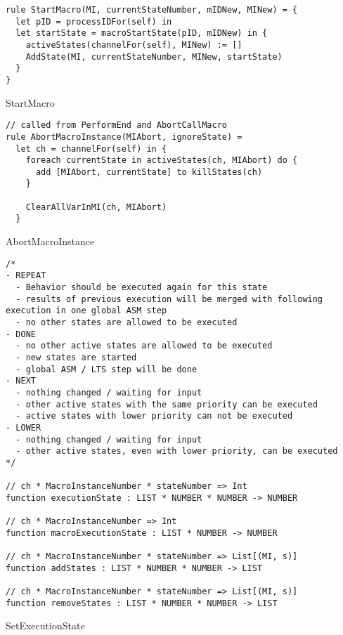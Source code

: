 \begin{listing}[H]
\begin{verbatim}
rule StartMacro(MI, currentStateNumber, mIDNew, MINew) = {
  let pID = processIDFor(self) in
  let startState = macroStartState(pID, mIDNew) in {
    activeStates(channelFor(self), MINew) := []
    AddState(MI, currentStateNumber, MINew, startState)
  }
}
\end{verbatim}
\caption{StartMacro}
\label{lst:asm:StartMacro}
\end{listing}


\begin{listing}[H]
\begin{verbatim}
// called from PerformEnd and AbortCallMacro
rule AbortMacroInstance(MIAbort, ignoreState) =
  let ch = channelFor(self) in {
    foreach currentState in activeStates(ch, MIAbort) do {
      add [MIAbort, currentState] to killStates(ch)
    }

    ClearAllVarInMI(ch, MIAbort)
  }
\end{verbatim}
\caption{AbortMacroInstance}
\label{lst:asm:AbortMacroInstance}
\end{listing}



\begin{listing}[H]
\begin{verbatim}
/*
- REPEAT
  - Behavior should be executed again for this state
  - results of previous execution will be merged with following execution in one global ASM step
  - no other states are allowed to be executed
- DONE
  - no other active states are allowed to be executed
  - new states are started
  - global ASM / LTS step will be done
- NEXT
  - nothing changed / waiting for input
  - other active states with the same priority can be executed
  - active states with lower priority can not be executed
- LOWER
  - nothing changed / waiting for input
  - other active states, even with lower priority, can be executed
*/

// ch * MacroInstanceNumber * stateNumber => Int
function executionState : LIST * NUMBER * NUMBER -> NUMBER

// ch * MacroInstanceNumber => Int
function macroExecutionState : LIST * NUMBER -> NUMBER

// ch * MacroInstanceNumber * stateNumber => List[(MI, s)]
function addStates : LIST * NUMBER * NUMBER -> LIST

// ch * MacroInstanceNumber * stateNumber => List[(MI, s)]
function removeStates : LIST * NUMBER * NUMBER -> LIST
\end{verbatim}
\caption{SetExecutionState}
\label{lst:asm:SetExecutionState}
\end{listing}




